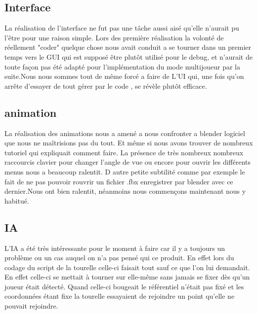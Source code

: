 ﻿\documentclass[12pt]{article}
\begin{document}
\subsection*{Interface}
La réalisation de l'interface ne fut pas une tâche aussi aisé qu'elle n'aurait pu l'être pour une raison simple. Lors des première réalisation la volonté de réellement "coder" quelque chose nous avait conduit a se tourner dans un premier temps vers le GUI qui est supposé être plutôt utilisé pour le debug, et n'aurait de toute façon pas été adapté pour l'implémentation du mode multijoueur par la suite.Nous nous sommes tout de même forcé a faire de L'UI qui, une fois qu'on arrête d'essayer de tout gérer par le code , se révèle plutôt efficace.

\subsection{animation}
La réalisation des animations nous a amené a nous confronter a blender logiciel que nous ne maîtrisions pas du tout. Et même si nous avons trouver de nombreux tutoriel qui expliquait comment faire. La présence de très nombreux nombreux raccourcis clavier pour changer l'angle de vue ou encore pour ouvrir les différents menus nous a beaucoup  ralentit. D autre petite subtilité comme par exemple le fait de ne pas pouvoir rouvrir un fichier .fbx enregistrer par blender avec ce dernier.Nous ont bien ralentit, néanmoins nous commençons maintenant nous y habitué.

\subsection {IA}

L'IA a été très intéressante pour le moment à faire car il y a toujours un problème ou un cas auquel on 
n'a pas pensé qui ce produit. En effet lors du codage du script de la tourelle celle-ci faisait tout sauf 
ce que l'on lui demandait.
En effet celle-ci se mettait à tourner sur elle-même sans jamais se fixer dès qu'un joueur était détecté. 
Quand celle-ci bougeait le référentiel n'était pas fixé et les coordonnées étant fixe la tourelle essayaient 
de rejoindre un point qu'elle ne pouvait rejoindre.
\end{document}
